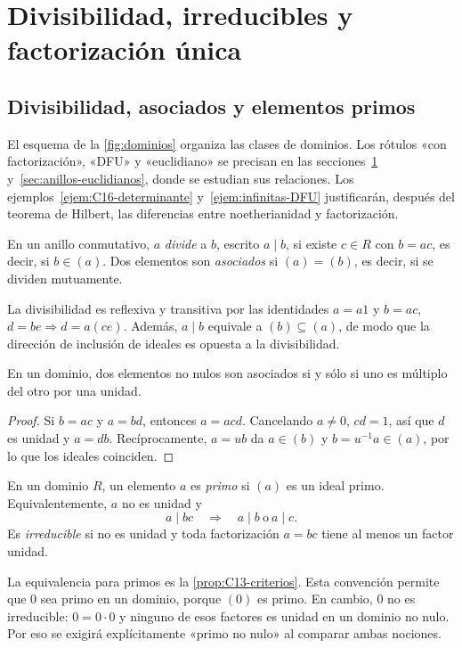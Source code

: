\section{Divisibilidad, irreducibles y factorización única}\label{sec:anillos-factorizacion}

\subsection{Divisibilidad, asociados y elementos primos}\label{tema:15-3-1}\label{tema:15-3-2}
El esquema de la \cref{fig:dominios} organiza las clases de dominios. Los rótulos «con factorización», «DFU» y «euclidiano» se precisan en las secciones~\ref{sec:anillos-factorizacion} y~\ref{sec:anillos-euclidianos}, donde se estudian sus relaciones. Los ejemplos~\ref{ejem:C16-determinante} y~\ref{ejem:infinitas-DFU} justificarán, después del teorema de Hilbert, las diferencias entre noetherianidad y factorización.

\begin{defi}
En un anillo conmutativo, $a$ \emph{divide} a $b$, escrito $a\mid b$, si existe $c\in R$ con $b=ac$, es decir, si $b\in(a)$. Dos elementos son \emph{asociados} si $(a)=(b)$, es decir, si se dividen mutuamente.
\end{defi}
La divisibilidad es reflexiva y transitiva por las identidades $a=a1$ y $b=ac$, $d=be\Rightarrow d=a(ce)$. Además, $a\mid b$ equivale a $(b)\subseteq(a)$, de modo que la dirección de inclusión de ideales es opuesta a la divisibilidad.

\begin{lema}\label{lema:C15-asociados}
En un dominio, dos elementos no nulos son asociados si y sólo si uno es múltiplo del otro por una unidad.
\end{lema}
\begin{proof}
Si $b=ac$ y $a=bd$, entonces $a=acd$. Cancelando $a\ne0$, $cd=1$, así que $d$ es unidad y $a=db$. Recíprocamente, $a=ub$ da $a\in(b)$ y $b=u^{-1}a\in(a)$, por lo que los ideales coinciden.
\end{proof}

\begin{defi}
En un dominio $R$, un elemento $a$ es \emph{primo} si $(a)$ es un ideal primo. Equivalentemente, $a$ no es unidad y
\[
a\mid bc\quad\Longrightarrow\quad a\mid b\ \text{o}\ a\mid c.
\]
Es \emph{irreducible} si no es unidad y toda factorización $a=bc$ tiene al menos un factor unidad.
\end{defi}
La equivalencia para primos es la \cref{prop:C13-criterios}. Esta convención permite que $0$ sea primo en un dominio, porque $(0)$ es primo. En cambio, $0$ no es irreducible: $0=0\cdot0$ y ninguno de esos factores es unidad en un dominio no nulo. Por eso se exigirá explícitamente «primo no nulo» al comparar ambas nociones.

